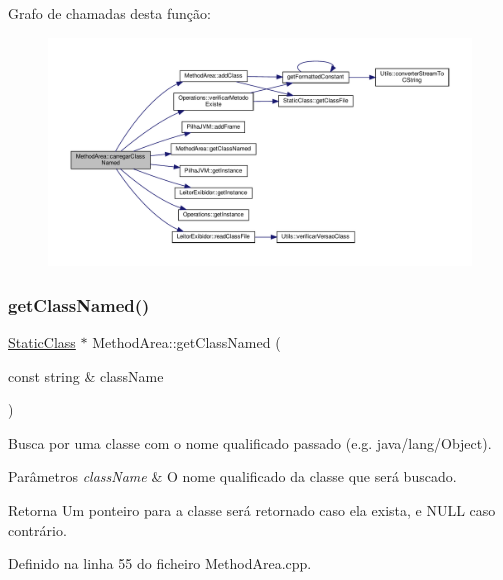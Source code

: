 Grafo de chamadas desta função\+:\nopagebreak
\begin{figure}[H]
\begin{center}
\leavevmode
\includegraphics[width=350pt]{classMethodArea_a6e5cd27f3133d70a8c56c5daf9190ba6_cgraph}
\end{center}
\end{figure}
\mbox{\label{classMethodArea_a1fb65cf5f35cadbe2be8ad1aece57025}} 
\subsubsection{\texorpdfstring{get\+Class\+Named()}{getClassNamed()}}
{\footnotesize\ttfamily \hyperlink{classStaticClass}{Static\+Class} $\ast$ Method\+Area\+::get\+Class\+Named (\begin{DoxyParamCaption}\item[{const string \&}]{class\+Name }\end{DoxyParamCaption})}



Busca por uma classe com o nome qualificado passado (e.\+g. java/lang/\+Object). 


\begin{DoxyParams}{Parâmetros}
{\em class\+Name} & O nome qualificado da classe que será buscado. \\
\hline
\end{DoxyParams}
\begin{DoxyReturn}{Retorna}
Um ponteiro para a classe será retornado caso ela exista, e {\ttfamily N\+U\+LL} caso contrário. 
\end{DoxyReturn}


Definido na linha 55 do ficheiro Method\+Area.\+cpp.



